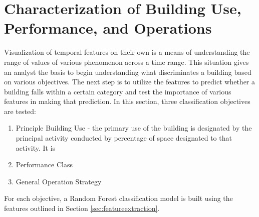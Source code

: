 \section{Characterization of Building Use, Performance, and Operations}
\label{sec:characterization}

Visualization of temporal features on their own is a means of understanding the range of values of various phenomenon across a time range. This situation gives an analyst the basis to begin understanding what discriminates a building based on various objectives. The next step is to utilize the features to predict whether a building falls within a certain category and test the importance of various features in making that prediction. In this section, three classification objectives are tested: 

\begin{enumerate}
\item Principle Building Use - the primary use of the building is designated by the principal activity conducted by percentage of space designated to that activity. It is 
\item Performance Class
\item General Operation Strategy
\end{enumerate}

For each objective, a Random Forest classification model is built using the features outlined in Section \ref{sec:featureextraction}.
